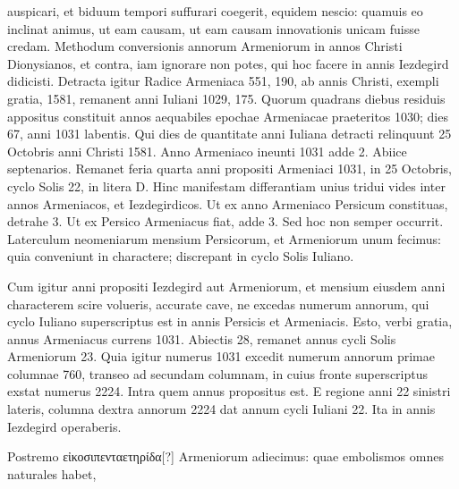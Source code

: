 auspicari, et biduum tempori suffurari coegerit, equidem nescio:
quamuis eo inclinat
animus, ut eam causam,
ut eam causam
innovationis unicam
fuisse credam.
Methodum conversionis
annorum Armeniorum
in annos
Christi Dionysianos,
et contra, iam ignorare
non potes, qui
hoc facere in annis
Iezdegird didicisti.
Detracta igitur Radice
Armeniaca 551,
190, ab annis Christi,
exempli gratia, 1581,
remanent anni Iuliani
1029, 175.
Quorum
quadrans diebus residuis
appositus constituit
annos aequabiles
epochae Armeniacae
praeteritos 1030; dies
67, anni 1031 labentis.
Qui dies de quantitate
anni Iuliana detracti relinquunt 25
Octobris anni Christi 1581.
%
Anno Armeniaco ineunti 1031 adde 2.
Abiice septenarios.
Remanet feria quarta anni propositi Armeniaci
1031, in 25 Octobris, cyclo Solis 22, in litera D\@.
Hinc manifestam
differantiam unius tridui vides inter annos Armeniacos, et Iezdegirdicos.
Ut ex anno Armeniaco Persicum constituas, detrahe 3.
Ut
ex Persico Armeniacus fiat, adde 3.
Sed hoc non semper occurrit.
Laterculum neomeniarum mensium Persicorum, et Armeniorum unum
fecimus: quia conveniunt in charactere; discrepant in cyclo Solis
Iuliano.
\begin{table}[tbp]
  
\end{table}
%
Cum igitur anni propositi Iezdegird aut Armeniorum, et mensium
eiusdem anni characterem scire volueris, accurate cave, ne excedas
numerum annorum, qui cyclo Iuliano superscriptus est in annis Persicis
et Armeniacis.
Esto, verbi gratia, annus Armeniacus currens 1031.
Abiectis 28, remanet annus cycli Solis Armeniorum 23.
Quia igitur
numerus 1031 excedit numerum annorum primae columnae 760,
transeo ad secundam columnam, in cuius fronte superscriptus exstat
numerus 2224.
Intra quem annus propositus est.
E regione anni 22
sinistri lateris, columna dextra annorum 2224 dat annum cycli Iuliani
22.
Ita in annis Iezdegird operaberis.
\begin{table}[tbp]
  
\end{table}
%
Postremo \textgreek{εἰκοσιπενταετηρίδα}[?]
Armeniorum adiecimus: quae embolismos omnes naturales habet,
